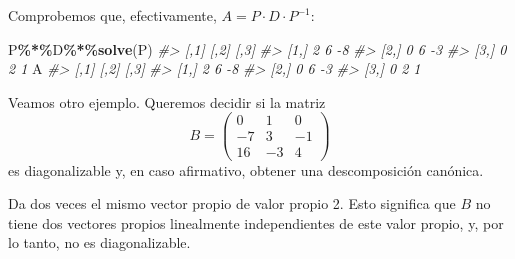 \documentclass[
]{book}
\newenvironment{Shaded}{\begin{snugshade}}{\end{snugshade}}
\newcommand{\CommentTok}[1]{\textcolor[rgb]{0.56,0.35,0.01}{\textit{#1}}}
\newcommand{\DataTypeTok}[1]{\textcolor[rgb]{0.13,0.29,0.53}{#1}}
\newcommand{\DecValTok}[1]{\textcolor[rgb]{0.00,0.00,0.81}{#1}}
\newcommand{\KeywordTok}[1]{\textcolor[rgb]{0.13,0.29,0.53}{\textbf{#1}}}
\newcommand{\NormalTok}[1]{#1}
\newcommand{\OperatorTok}[1]{\textcolor[rgb]{0.81,0.36,0.00}{\textbf{#1}}}
\newcommand{\OtherTok}[1]{\textcolor[rgb]{0.56,0.35,0.01}{#1}}
\theoremstyle{definition}
\theoremstyle{definition}
\theoremstyle{definition}
\theoremstyle{remark}
\begin{document}
Comprobemos que, efectivamente, \(A=P\cdot D\cdot P^{-1}\):

\begin{Shaded}
\begin{Highlighting}[]
\NormalTok{P}\OperatorTok{\%*\%}\NormalTok{D}\OperatorTok{\%*\%}\KeywordTok{solve}\NormalTok{(P)}
\CommentTok{\#\textgreater{}      [,1] [,2] [,3]}
\CommentTok{\#\textgreater{} [1,]    2    6   {-}8}
\CommentTok{\#\textgreater{} [2,]    0    6   {-}3}
\CommentTok{\#\textgreater{} [3,]    0    2    1}
\NormalTok{A}
\CommentTok{\#\textgreater{}      [,1] [,2] [,3]}
\CommentTok{\#\textgreater{} [1,]    2    6   {-}8}
\CommentTok{\#\textgreater{} [2,]    0    6   {-}3}
\CommentTok{\#\textgreater{} [3,]    0    2    1}
\end{Highlighting}
\end{Shaded}

Veamos otro ejemplo. Queremos decidir si la matriz
\[
B=\left(\begin{array}{ccc}0 & 1 & 0 \\ -7 & 3 & -1 \\ 16 & -3 & 4\end{array}
\right)
\]
es diagonalizable y, en caso afirmativo, obtener una descomposición canónica.

\begin{Shaded}
\end{Shaded}

Da dos veces el mismo vector propio de valor propio 2. Esto significa que \(B\) no tiene dos vectores propios linealmente independientes de este valor propio, y, por lo tanto, no es diagonalizable.
\end{document}
